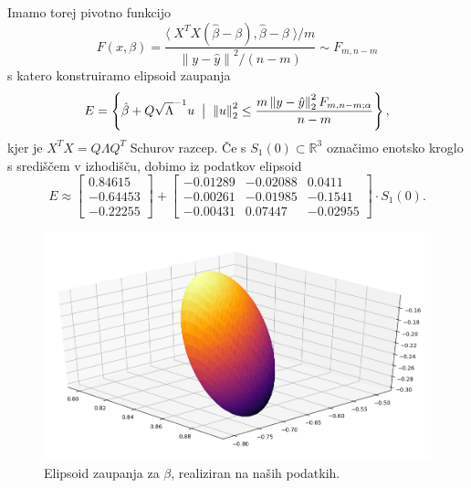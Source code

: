 \documentclass[ letterpaper, titlepage, fleqn]{article}
\newcommand{\R}{\mathbb R}
\newcommand{\norm}[1]{\left\lVert#1\right\rVert}
\newcommand{\scalar}[1]{\langle\;#1\;\rangle}
\begin{document}
\subsubsection{}
Imamo torej pivotno funkcijo
$$F(x, \beta) = \frac{\scalar{X^T X  (\hat{\beta} - \beta), \hat{\beta} - \beta} / m}{\norm{y - \hat{y}}^2 / (n-m)} \sim F_{m, n-m}$$
s katero konstruiramo elipsoid zaupanja 
$$E = \left\{\hat{\beta} + Q\sqrt{\Lambda}^{-1} u \;\bigm|\; \norm{u}_2^2 \leq \frac{m\norm{y - \hat{y}}_2^2  F_{m, n-m; \alpha} }{n-m}\right\},$$
kjer je $X^TX = Q\Lambda Q^T$ Schurov razcep. Če s $S_1(0) \subset \R^3$ označimo enotsko kroglo s središčem v izhodišču, dobimo iz podatkov elipsoid 
$$E \approx
\begin{bmatrix}
0.84615 \\
-0.64453  \\
-0.22255  
\end{bmatrix}
+ 
\begin{bmatrix}
-0.01289 & -0.02088 & 0.0411 \\
-0.00261 & -0.01985 & -0.1541 \\
-0.00431 & 0.07447 & -0.02955
\end{bmatrix}
\cdot S_1(0).
$$
\begin{center}
\begin{figure}[h]
\includegraphics[width=16cm]{graphics/ConfidenceElipsoid1.png}
\caption{Elipsoid zaupanja za $\beta$, realiziran na naših podatkih.}
\end{figure}
\end{center}
\end{document}
